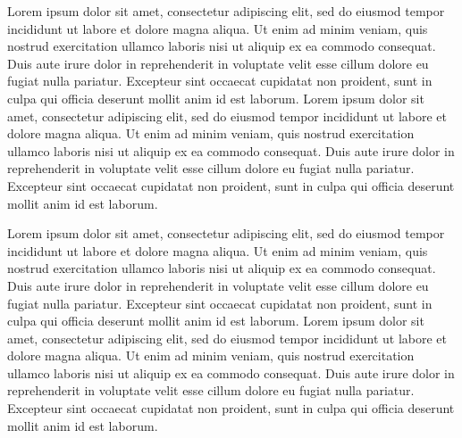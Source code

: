 \documentclass{sbc2025}%
\begin{document}
Lorem ipsum dolor sit amet, consectetur adipiscing elit, sed do eiusmod tempor incididunt ut labore et dolore magna aliqua. Ut enim ad minim veniam, quis nostrud exercitation ullamco laboris nisi ut aliquip ex ea commodo consequat. Duis aute irure dolor in reprehenderit in voluptate velit esse cillum dolore eu fugiat nulla pariatur. Excepteur sint occaecat cupidatat non proident, sunt in culpa qui officia deserunt mollit anim id est laborum. Lorem ipsum dolor sit amet, consectetur adipiscing elit, sed do eiusmod tempor incididunt ut labore et dolore magna aliqua. Ut enim ad minim veniam, quis nostrud exercitation ullamco laboris nisi ut aliquip ex ea commodo consequat. Duis aute irure dolor in reprehenderit in voluptate velit esse cillum dolore eu fugiat nulla pariatur. Excepteur sint occaecat cupidatat non proident, sunt in culpa qui officia deserunt mollit anim id est laborum.

Lorem ipsum dolor sit amet, consectetur adipiscing elit, sed do eiusmod tempor incididunt ut labore et dolore magna aliqua. Ut enim ad minim veniam, quis nostrud exercitation ullamco laboris nisi ut aliquip ex ea commodo consequat. Duis aute irure dolor in reprehenderit in voluptate velit esse cillum dolore eu fugiat nulla pariatur. Excepteur sint occaecat cupidatat non proident, sunt in culpa qui officia deserunt mollit anim id est laborum. Lorem ipsum dolor sit amet, consectetur adipiscing elit, sed do eiusmod tempor incididunt ut labore et dolore magna aliqua. Ut enim ad minim veniam, quis nostrud exercitation ullamco laboris nisi ut aliquip ex ea commodo consequat. Duis aute irure dolor in reprehenderit in voluptate velit esse cillum dolore eu fugiat nulla pariatur. Excepteur sint occaecat cupidatat non proident, sunt in culpa qui officia deserunt mollit anim id est laborum.
\end{document}
